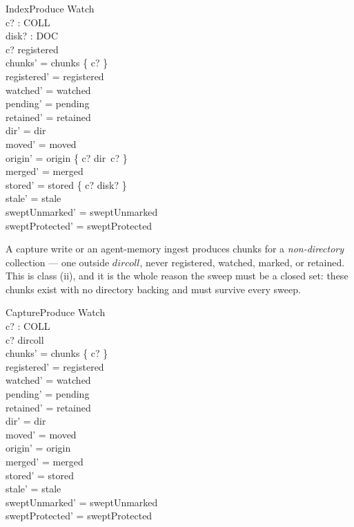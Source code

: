 \documentclass[a4paper]{article}
\begin{document}
\begin{schema}{IndexProduce}
  \Delta Watch \\
  c? : COLL \\
  disk? : \power DOC \\
  \where
  c? \in registered \\
  chunks' = chunks \cup \{ c? \} \\
  registered' = registered \\
  watched' = watched \\
  pending' = pending \\
  retained' = retained \\
  dir' = dir \\
  moved' = moved \\
  origin' = origin \oplus \{ c? \mapsto dir~c? \} \\
  merged' = merged \\
  stored' = stored \oplus \{ c? \mapsto disk? \} \\
  stale' = stale \\
  sweptUnmarked' = sweptUnmarked \\
  sweptProtected' = sweptProtected
\end{schema}

A capture write or an agent-memory ingest produces chunks for a
\textit{non-directory} collection --- one outside $dircoll$, never registered,
watched, marked, or retained.  This is class (ii), and it is the whole reason the
sweep must be a closed set: these chunks exist with no directory backing and must
survive every sweep.

\begin{schema}{CaptureProduce}
  \Delta Watch \\
  c? : COLL \\
  \where
  c? \notin dircoll \\
  chunks' = chunks \cup \{ c? \} \\
  registered' = registered \\
  watched' = watched \\
  pending' = pending \\
  retained' = retained \\
  dir' = dir \\
  moved' = moved \\
  origin' = origin \\
  merged' = merged \\
  stored' = stored \\
  stale' = stale \\
  sweptUnmarked' = sweptUnmarked \\
  sweptProtected' = sweptProtected
\end{schema}
\end{document}
